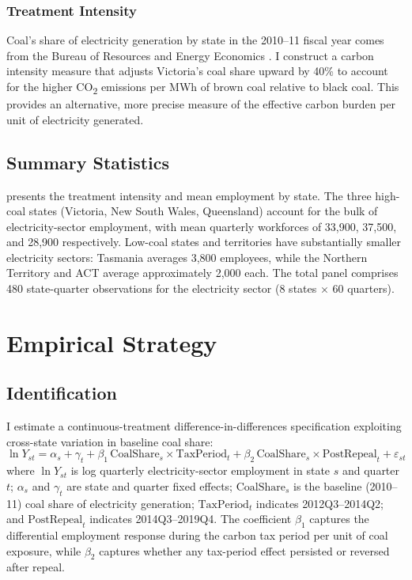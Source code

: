 \documentclass[12pt]{article}
\begin{document}
\subsubsection*{Treatment Intensity} Coal's share of electricity generation by state in the 2010--11 fiscal year comes from the Bureau of Resources and Energy Economics \citep{bree2012energy}. I construct a carbon intensity measure that adjusts Victoria's coal share upward by 40\% to account for the higher CO\textsubscript{2} emissions per MWh of brown coal relative to black coal. This provides an alternative, more precise measure of the effective carbon burden per unit of electricity generated.

\subsection{Summary Statistics}

 presents the treatment intensity and mean employment by state. The three high-coal states (Victoria, New South Wales, Queensland) account for the bulk of electricity-sector employment, with mean quarterly workforces of 33,900, 37,500, and 28,900 respectively. Low-coal states and territories have substantially smaller electricity sectors: Tasmania averages 3,800 employees, while the Northern Territory and ACT average approximately 2,000 each. The total panel comprises 480 state-quarter observations for the electricity sector (8 states $\times$ 60 quarters).




\section{Empirical Strategy}

\subsection{Identification}

I estimate a continuous-treatment difference-in-differences specification exploiting cross-state variation in baseline coal share:
\begin{equation}
\ln Y_{st} = \alpha_s + \gamma_t + \beta_1 \, \text{CoalShare}_s \times \text{TaxPeriod}_t + \beta_2 \, \text{CoalShare}_s \times \text{PostRepeal}_t + \varepsilon_{st}
\label{eq:main}
\end{equation}
where $\ln Y_{st}$ is log quarterly electricity-sector employment in state $s$ and quarter $t$; $\alpha_s$ and $\gamma_t$ are state and quarter fixed effects; $\text{CoalShare}_s$ is the baseline (2010--11) coal share of electricity generation; $\text{TaxPeriod}_t$ indicates 2012Q3--2014Q2; and $\text{PostRepeal}_t$ indicates 2014Q3--2019Q4. The coefficient $\beta_1$ captures the differential employment response during the carbon tax period per unit of coal exposure, while $\beta_2$ captures whether any tax-period effect persisted or reversed after repeal.
\end{document}
